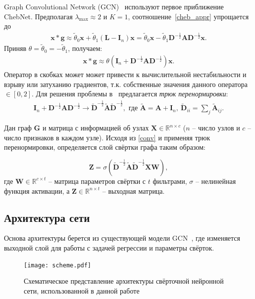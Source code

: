 \documentclass[14pt]{extarticle}
\begin{document}
Graph Convolutional Network (GCN)~\cite{kipf_semi-supervised_2017} используют первое приближение ChebNet. Предполагая $\lambda_{\max} \approx 2$ и $K=1$, соотношение~\eqref{cheb_appr} упрощается до 
\begin{align}
\mathbf{x} * \mathbf{g} \approx \tilde{\theta}_{0} \mathbf{x}+\tilde{\theta}_{1}\left(\mathbf{L}-\mathbf{I}_{n}\right) \mathbf{x}=\tilde{\theta}_{0} \mathbf{x}-\tilde{\theta}_{1} \mathbf{D}^{-\frac{1}{2}} \mathbf{A} \mathbf{D}^{-\frac{1}{2}} \mathbf{x}.
\end{align}
Приняв $\theta = \tilde{\theta}_0  = -\tilde{\theta}_1$, получаем:
\begin{align}
\mathbf{x} * \mathbf{g}  \approx \theta\left(\mathbf{I}_{n}+\mathbf{D}^{-\frac{1}{2}} \mathbf{A} \mathbf{D}^{-\frac{1}{2}}\right) \mathbf{x}.
\label{conv}
\end{align}
Оператор в скобках может может привести к вычислительной нестабильности и взрыву или затуханию градиентов, т.к. собственные значения данного оператора $\in [0,2]$. Для решения проблемы в~\cite{kipf_semi-supervised_2017} предлагается \textit{трюк перенормировки}: 
\begin{align*}
\mathbf{I}_{n}+\mathbf{D}^{-\frac{1}{2}} \mathbf{A} \mathbf{D}^{-\frac{1}{2}} \rightarrow
\tilde{\mathbf{D}}^{-\frac{1}{2}} \tilde{\mathbf{A}}\tilde{\mathbf{D}}^{-\frac{1}{2}}, 
\text{ где }
\tilde{\mathbf{A}}=\mathbf{A}+\mathbf{I}_{n},~ \tilde{\mathbf{D}}_{i i}=\sum_{j} \tilde{\mathbf{A}}_{i j}.
\end{align*}



Дан граф $\mathbf{G}$ и матрица с информацией об узлах $\mathbf{X} \in \mathbb{R}^{n \times c}$ ($n$ -- число узлов и $c$ -- число признаков в каждом узле). Исходя из \eqref{conv} и применяя трюк перенормировки, определяется слой свёртки графа таким образом:

\[\mathbf{Z}=\sigma\left(\tilde{\mathbf{D}}^{-\frac{1}{2}} \tilde{\mathbf{A}}\tilde{\mathbf{D}}^{-\frac{1}{2}} \mathbf{X} \mathbf{W}\right),\]
где $\mathbf{W} \in \mathbb{R}^{c \times t}$ – матрица параметров свёртки с $t$ фильтрами, $\sigma$ – нелинейная функция активации, а $\mathbf{Z} \in \mathbb{R}^{n \times t}$ -- выходная матрица.

\subsection{Архитектура сети}
Основа архитектуры берется из существующей модели GCN~\cite{kipf_semi-supervised_2017}, где изменяется выходной слой для работы с задачей регрессии и параметры свёрток.
\begin{figure}[h]
	\centering
	\texttt{[image: scheme.pdf]}
	\caption{Схематическое представление архитектуры свёрточной нейронной сети, использованной в данной работе}
	\label{fig:scheme}
\end{figure}
\end{document}
